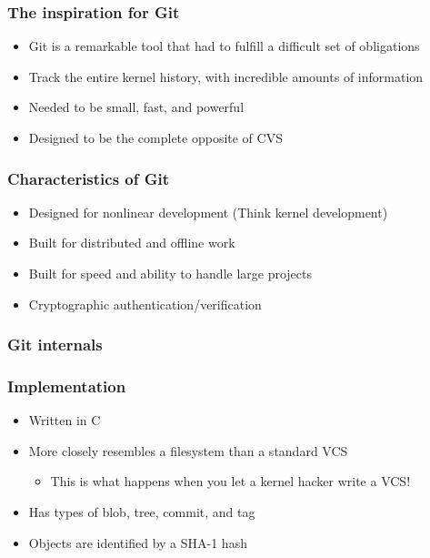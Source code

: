 \documentclass{beamer}
\begin{document}
\begin{frame}
  \frametitle{The inspiration for Git}
  \begin{itemize}
    \item Git is a remarkable tool that had to fulfill a difficult set of obligations
    \item Track the entire kernel history, with incredible amounts of information
    \item Needed to be small, fast, and powerful
    \item Designed to be the complete opposite of CVS
  \end{itemize}
\end{frame}

\begin{frame}
  \frametitle{Characteristics of Git}
  \begin{itemize}
    \item Designed for nonlinear development (Think kernel development)
    \item Built for distributed and offline work
    \item Built for speed and ability to handle large projects
    \item Cryptographic authentication/verification
  \end{itemize}
\end{frame}

\subsubsection{Git internals}

\begin{frame}
  \frametitle{Implementation}
  \begin{itemize}
    \item Written in C
    \item More closely resembles a filesystem than a standard VCS
      \begin{itemize}
	\item This is what happens when you let a kernel hacker write a VCS!
      \end{itemize}
    \item Has types of blob, tree, commit, and tag
    \item Objects are identified by a SHA-1 hash
  \end{itemize}
\end{frame}
\end{document}
